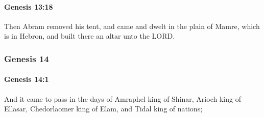		\paragraph{Genesis 13:18} %
			\label{GENESIS-13-18}

			Then Abram removed his tent, and came and dwelt in the plain of Mamre, which is in Hebron, and built there an altar unto the LORD.

	\subsubsection{Genesis 14} %
		\label{GENESIS-14}

		\paragraph{Genesis 14:1} %
			\label{GENESIS-14-1}

			And it came to pass in the days of Amraphel king of Shinar, Arioch king of Ellasar, Chedorlaomer king of Elam, and Tidal king of nations;

